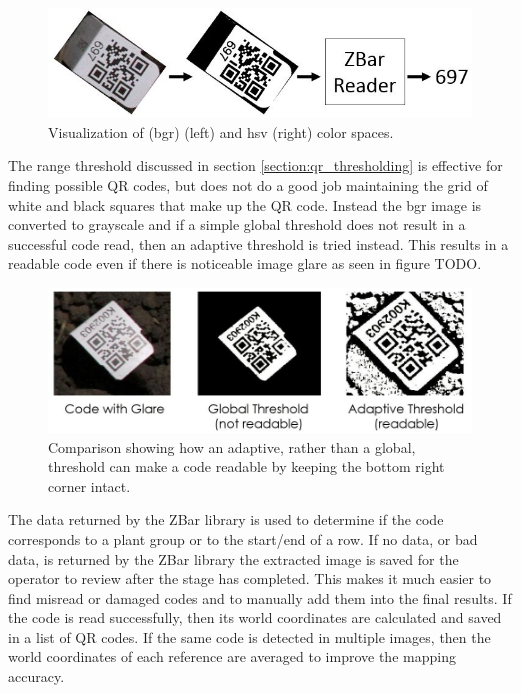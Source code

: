 \begin{figure}
	\centering
    \includegraphics[width=6in]{figures/code_extraction_step2.jpg}
    \caption[Color spaces]{Visualization of \ac{(bgr)} (left) and \ac{hsv} (right) color spaces.}
    \label{figure:code_extraction2}
\end{figure} 

The range threshold discussed in section \ref{section:qr_thresholding} is effective for finding possible QR codes, but does not do a good job maintaining the grid of white and black squares that make up the QR code.  Instead the \ac{bgr} image is converted to grayscale and if a simple global threshold does not result in a successful code read, then an adaptive threshold is tried instead.  This results in a readable code even if there is noticeable image glare as seen in figure TODO. 

\begin{figure}
	\centering
    \includegraphics[width=5.5in]{figures/adaptive_threshold.jpg}
    \caption[Adaptive threshold]{Comparison showing how an adaptive, rather than a global, threshold can make a code readable by keeping the bottom right corner intact.}
    \label{figure:adaptive_threshold}
\end{figure} 

The data returned by the ZBar library is used to determine if the code corresponds to a plant group or to the start/end of a row.  If no data, or bad data, is returned by the ZBar library the extracted image is saved for the operator to review after the stage has completed.  This makes it much easier to find misread or damaged codes and to manually add them into the final results.  If the code is read successfully, then its world coordinates are calculated and saved in a list of QR codes.   If the same code is detected in multiple images, then the world coordinates of each reference are averaged to improve the mapping accuracy.

